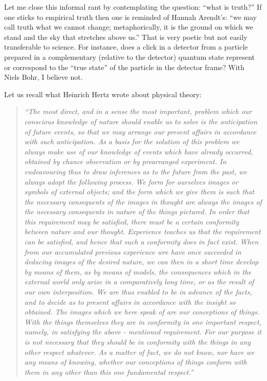 Let me close this informal rant by contemplating the question: ``what is truth?''
If one sticks to empirical truth then one is reminded of Hannah Arendt's\cite{Arendt-1967-truth}:
``we may call truth what we cannot change; metaphorically,
it is the ground on which we stand and the sky that stretches above us.''
That is very poetic but not easily transferable to science.
For instance, does a click in a detector from a particle prepared in a complementary (relative to the detector) quantum state
represent or correspond to the ``true state'' of the particle in the detector frame? With Niels Bohr, I believe not.

Let us recall what Heinrich Hertz\cite{hertz-94e} wrote about physical theory:
\begin{quote}
{\em
``The most direct, and in a sense the most important, problem
which our conscious knowledge of nature should enable us to
solve is the anticipation of future events, so that we may
arrange our present affairs in accordance with such anticipation.
As a basis for the solution of this problem we always
make use of our knowledge of events which have already
occurred, obtained by chance observation or by prearranged
experiment. In endeavouring thus to draw inferences as to
the future from the past, we always adopt the following process.
We form for ourselves images or symbols of external objects;
and the form which we give them is such that the necessary
consequents of the images in thought are always the images of
the necessary consequents in nature of the things pictured. In
order that this requirement may be satisfied, there must be a
certain conformity between nature and our thought. Experience
teaches us that the requirement can be satisfied, and hence that
such a conformity does in fact exist. When from our accumulated
previous experience wre have once succeeded in deducing
images of the desired nature, we can then in a short time
develop by means of them, as by means of models, the
consequences which in the external world only arise in a comparatively
long time, or as the result of our own interposition.
We are thus enabled to be in advance of the facts, and to
decide as to present affairs in accordance with the insight so
obtained. The images which we here speak of are our conceptions
of things. With the things themselves they are in
conformity in one important respect, namely, in satisfying the
above - mentioned requirement. For our purpose it is not
necessary that they should be in conformity with the things in
any other respect whatever. As a matter of fact, we do not
know, nor have we any means of knowing, whether our conceptions
of things conform with them in any other
than this one fundamental respect.''
}
\end{quote}


